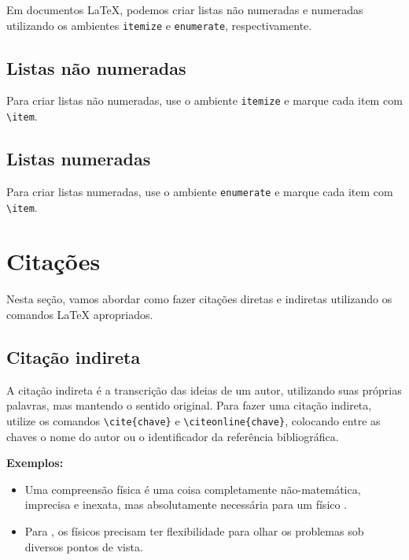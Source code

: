 Em documentos \LaTeX, podemos criar listas não numeradas e numeradas utilizando os ambientes \verb|itemize| e \verb|enumerate|, respectivamente.

\subsection{Listas não numeradas}
\label{subsec:listasNaoNumeradas}
\noindent
Para criar listas não numeradas, use o ambiente \verb|itemize| e marque cada item com \verb|\item|.



\subsection{Listas numeradas}
\label{subsec:listasNumeradas}
\noindent
Para criar listas numeradas, use o ambiente \verb|enumerate| e marque cada item com \verb|\item|.



\section{Citações}
\label{sec:citacoes}

Nesta seção, vamos abordar como fazer citações diretas e indiretas utilizando os comandos \LaTeX{} apropriados.

\subsection{Citação indireta}
\label{subsec:citacaoIndireta}

A citação indireta é a transcrição das ideias de um autor, utilizando suas próprias palavras, mas mantendo o sentido original. Para fazer uma citação indireta, utilize os comandos \verb|\cite{chave}| e \verb|\citeonline{chave}|, colocando entre as chaves o nome do autor ou o identificador da referência bibliográfica.

\textbf{Exemplos:}
\begin{itemize}
    \item  Uma compreensão física é uma coisa completamente não-matemática, imprecisa e inexata, mas absolutamente necessária para um físico \cite{feynman}.
    \item Para , os físicos precisam ter flexibilidade para olhar os problemas sob diversos pontos de vista.
\end{itemize}

